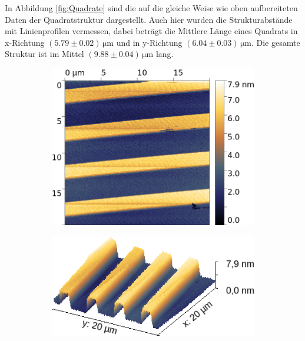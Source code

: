 In Abbildung \ref{fig:Quadrate} sind die auf die gleiche Weise wie oben aufbereiteten Daten der Quadratstruktur dargestellt.
Auch hier wurden die Strukturabstände mit Linienprofilen vermessen, dabei beträgt die Mittlere Länge eines Quadrats in x-Richtung $(5.79\pm 0.02)\,\si{\micro\meter}$ und in y-Richtung $(6.04\pm 0.03)\,\si{\micro\meter}$.
Die gesamte Struktur ist im Mittel $(9.88\pm 0.04)\,\si{\micro\meter}$ lang. 

\begin{figure}[H]
    \centering
    \begin{subfigure}{0.49\textwidth}
        \includegraphics[width=\textwidth]{bilder/Mikrostruktur/Streifen_Vor_2D.png}
        \caption{}
    \end{subfigure}
    \begin{subfigure}{0.49\textwidth}
        \includegraphics[width=\textwidth]{bilder/Mikrostruktur/Streifen_Vor_3D.png}
        \caption{}
    \end{subfigure}

\end{figure}
